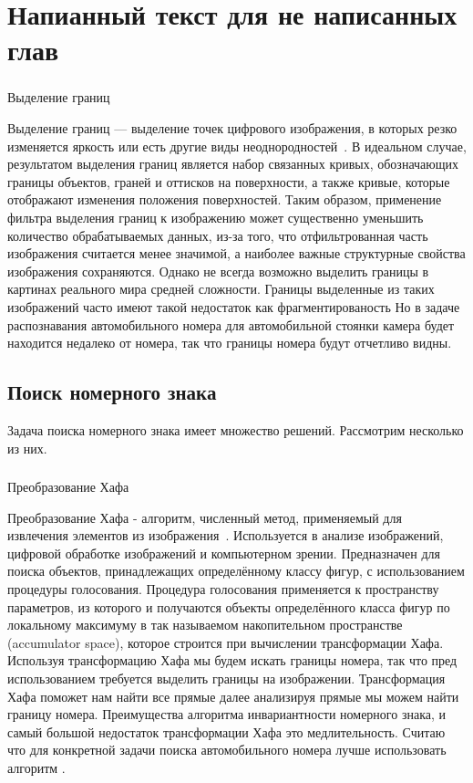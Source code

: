 \section{Напианный текст для не написанных глав}
\label{sec:temp}

\subsubsection{}
\label{sub:temp:image_processing:edge_detection}
Выделение границ

Выделение границ — выделение точек цифрового изображения, в которых резко изменяется яркость или есть другие виды неоднородностей~\cite{edge_detection}.
В идеальном случае, результатом выделения границ является набор связанных кривых, обозначающих границы объектов, граней и оттисков на поверхности, а также кривые, которые отображают изменения положения поверхностей. Таким образом, применение фильтра выделения границ к изображению может существенно уменьшить количество обрабатываемых данных, из-за того, что отфильтрованная часть изображения считается менее значимой, а наиболее важные структурные свойства изображения сохраняются. Однако не всегда возможно выделить границы в картинах реального мира средней сложности. Границы выделенные из таких изображений часто имеют такой недостаток как фрагментированость Но в задаче распознавания автомобильного номера для автомобильной стоянки камера будет находится недалеко от номера, так что границы номера будут отчетливо видны.

\subsection{Поиск номерного знака}
\label{sub:temp:search}
Задача поиска номерного знака имеет множество решений. Рассмотрим несколько из них.
\subsubsection{}
\label{sub:temp:search:hought}
Преобразование Хафа

Преобразование Хафа - алгоритм, численный метод, применяемый для извлечения элементов из изображения~\cite{hough_transform}. Используется в анализе изображений, цифровой обработке изображений и компьютерном зрении. Предназначен для поиска объектов, принадлежащих определённому классу фигур, с использованием процедуры голосования. Процедура голосования применяется к пространству параметров, из которого и получаются объекты определённого класса фигур по локальному максимуму в так называемом накопительном пространстве (accumulator space), которое строится при вычислении трансформации Хафа. Используя трансформацию Хафа мы будем искать границы номера, так что пред использованием требуется выделить границы на изображении. Трансформация Хафа поможет нам найти все прямые далее анализируя прямые мы можем найти границу номера. Преимущества алгоритма инвариантности номерного знака, и самый большой недостаток трансформации Хафа это медлительность. Считаю что для конкретной задачи поиска автомобильного номера лучше использовать алгоритм \segmentation.

